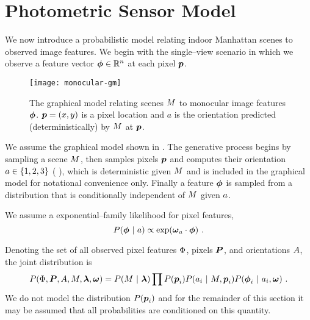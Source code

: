 \section{Photometric Sensor Model}

We now introduce a probabilistic model relating indoor Manhattan
scenes to observed image features. We begin with the single--view
scenario in which we observe a feature vector $\Feature\in\Reals^n$ at
each pixel $\Pixel$. 

\begin{figure}[tb]
  \centering
  \texttt{[image: monocular-gm]}
  \caption{The graphical model relating scenes $\Scene$ to monocular
    image features $\Feature$. $\Pixel=(x,y)$ is a pixel location and
    $a$ is the orientation predicted (deterministically) by $\Scene$
    at $\Pixel$.}
  \label{fig:monocular-gm}
\end{figure}

We assume the graphical model shown in . The
generative process begins by sampling a scene $\Scene$, then samples
pixels $\Pixel$ and computes their orientation
$\Orient\in\Orientations$ (\cf
{}), which is deterministic given $\Scene$
and is included in the graphical model for notational convenience
only. Finally a feature $\Feature$ is sampled from a distribution that
is conditionally independent of $\Scene$ given $\Orient$.

We assume a exponential--family likelihood for pixel features,
\begin{equation}
  \label{eq:pixel-likelihood}
  P(\Feature ~|~ \Orient) \propto
    \exp(\PixelModel_\Orient \cdot \Feature) ~.
\end{equation}

Denoting the set of all observed pixel
features $\Features$, pixels $\Pixels$, and orientations $\Orients$,
the joint distribution is
\begin{equation}
  P(\Features, \Pixels, \Orients, \Scene, \Penalties, \PixelModel) =
    P(\Scene ~|~ \Penalties) 
    \prod P(\Pixel_i)
          P(\Orient_i ~|~ \Scene, \Pixel_i)
          P(\Feature_i ~|~ \Orient_i, \PixelModel) ~.
\end{equation}
We do not model the distribution $P(\Pixel_i)$ and for the remainder
of this section it may be assumed that all probabilities are
conditioned on this quantity.

